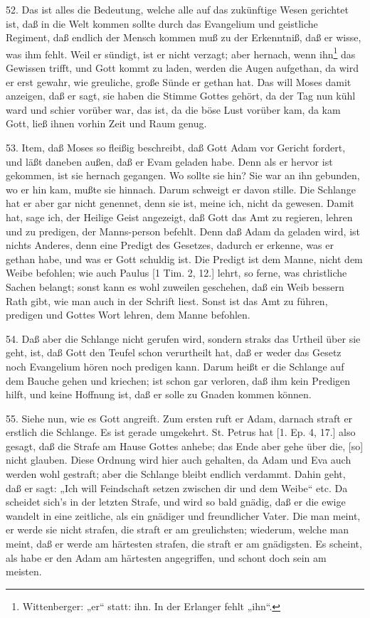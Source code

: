 52. Das ist alles die Bedeutung, welche alle auf das zukünftige Wesen gerichtet ist, daß in die Welt kommen sollte durch das Evangelium und geistliche Regiment, daß endlich der Mensch kommen muß zu der Erkenntniß, daß er wisse, was ihm fehlt. Weil er sündigt, ist er nicht verzagt; aber hernach, wenn ihn\footnote{Wittenberger: „er“ statt: ihn. In der Erlanger fehlt „ihn“.} das Gewissen trifft, und Gott kommt zu laden, werden die Augen aufgethan, da wird er erst gewahr, wie greuliche, große Sünde er gethan hat. Das will Moses damit anzeigen, daß er sagt, sie haben die Stimme Gottes gehört, da der Tag nun kühl ward und schier vorüber war, das ist, da die böse Lust vorüber kam, da kam Gott, ließ ihnen vorhin Zeit und Raum genug.

53. Item, daß Moses so fleißig beschreibt, daß Gott Adam vor Gericht fordert, und läßt daneben außen, daß er Evam geladen habe. Denn als er hervor ist gekommen, ist sie hernach gegangen. Wo sollte sie hin? Sie war an ihn gebunden, wo er hin kam, mußte sie hinnach. Darum schweigt er davon stille. Die Schlange hat er aber gar nicht genennet, denn sie ist, meine ich, nicht da gewesen. Damit hat, sage ich, der Heilige Geist angezeigt, daß Gott das Amt zu regieren, lehren und zu predigen, der Manns-person befehlt. Denn daß Adam da geladen wird, ist nichts Anderes, denn eine Predigt des Gesetzes, dadurch er erkenne, was er gethan habe, und was er Gott schuldig ist. Die Predigt ist dem Manne, nicht dem Weibe befohlen; wie auch Paulus [1 Tim. 2, 12.] lehrt, so ferne, was christliche Sachen belangt; sonst kann es wohl zuweilen geschehen, daß ein Weib bessern Rath gibt, wie man auch in der Schrift liest. Sonst ist das Amt zu führen, predigen und Gottes Wort lehren, dem Manne befohlen.

54. Daß aber die Schlange nicht gerufen wird, sondern straks das Urtheil über sie geht, ist, daß Gott den Teufel schon verurtheilt hat, daß er
weder das Gesetz noch Evangelium hören noch predigen kann. Darum heißt er die Schlange auf dem Bauche gehen und kriechen; ist schon gar verloren, daß ihm kein Predigen hilft, und keine Hoffnung ist, daß er solle zu Gnaden kommen können.

55. Siehe nun, wie es Gott angreift. Zum ersten ruft er Adam, darnach straft er erstlich die Schlange. Es ist gerade umgekehrt. St. Petrus hat [1. Ep. 4, 17.] also gesagt, daß die Strafe am Hause Gottes anhebe; das Ende aber gehe über die, [so] nicht glauben. Diese Ordnung wird hier auch gehalten, da Adam und Eva auch werden wohl gestraft; aber die Schlange bleibt endlich verdammt. Dahin geht, daß er sagt: „Ich will Feindschaft setzen zwischen dir und dem Weibe“ etc. Da scheidet sich’s in der letzten Strafe, und wird so bald gnädig, daß er die ewige wandelt in eine zeitliche, als ein gnädiger und freundlicher Vater. Die man meint, er werde sie nicht strafen, die straft er am greulichsten; wiederum, welche man meint, daß er werde am härtesten strafen, die straft er am gnädigsten. Es scheint, als habe er den Adam am härtesten angegriffen, und schont doch sein am meisten.

